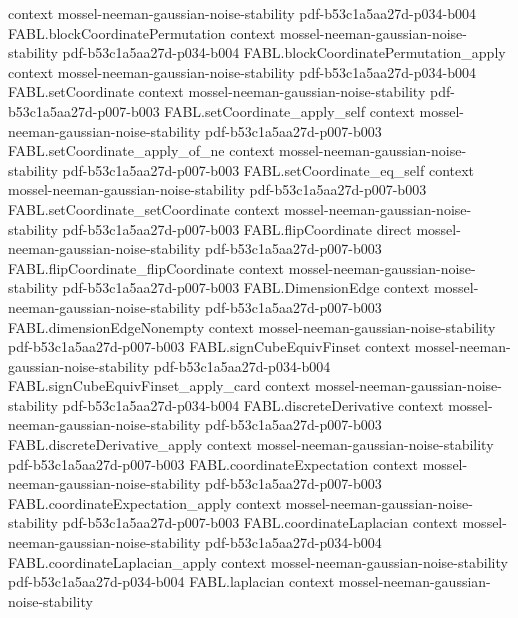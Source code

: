 \begin{theorem}
  {context}
  {mossel-neeman-gaussian-noise-stability}
  {pdf-b53c1a5aa27d-p034-b004}
\proofstep
  {FABL.blockCoordinatePermutation}
  {context}
  {mossel-neeman-gaussian-noise-stability}
  {pdf-b53c1a5aa27d-p034-b004}
\proofstep
  {FABL.blockCoordinatePermutation_apply}
  {context}
  {mossel-neeman-gaussian-noise-stability}
  {pdf-b53c1a5aa27d-p034-b004}
\proofstep
  {FABL.setCoordinate}
  {context}
  {mossel-neeman-gaussian-noise-stability}
  {pdf-b53c1a5aa27d-p007-b003}
\proofstep
  {FABL.setCoordinate_apply_self}
  {context}
  {mossel-neeman-gaussian-noise-stability}
  {pdf-b53c1a5aa27d-p007-b003}
\proofstep
  {FABL.setCoordinate_apply_of_ne}
  {context}
  {mossel-neeman-gaussian-noise-stability}
  {pdf-b53c1a5aa27d-p007-b003}
\proofstep
  {FABL.setCoordinate_eq_self}
  {context}
  {mossel-neeman-gaussian-noise-stability}
  {pdf-b53c1a5aa27d-p007-b003}
\proofstep
  {FABL.setCoordinate_setCoordinate}
  {context}
  {mossel-neeman-gaussian-noise-stability}
  {pdf-b53c1a5aa27d-p007-b003}
\proofstep
  {FABL.flipCoordinate}
  {direct}
  {mossel-neeman-gaussian-noise-stability}
  {pdf-b53c1a5aa27d-p007-b003}
\proofstep
  {FABL.flipCoordinate_flipCoordinate}
  {context}
  {mossel-neeman-gaussian-noise-stability}
  {pdf-b53c1a5aa27d-p007-b003}
\proofstep
  {FABL.DimensionEdge}
  {context}
  {mossel-neeman-gaussian-noise-stability}
  {pdf-b53c1a5aa27d-p007-b003}
\proofstep
  {FABL.dimensionEdgeNonempty}
  {context}
  {mossel-neeman-gaussian-noise-stability}
  {pdf-b53c1a5aa27d-p007-b003}
\proofstep
  {FABL.signCubeEquivFinset}
  {context}
  {mossel-neeman-gaussian-noise-stability}
  {pdf-b53c1a5aa27d-p034-b004}
\proofstep
  {FABL.signCubeEquivFinset_apply_card}
  {context}
  {mossel-neeman-gaussian-noise-stability}
  {pdf-b53c1a5aa27d-p034-b004}
\proofstep
  {FABL.discreteDerivative}
  {context}
  {mossel-neeman-gaussian-noise-stability}
  {pdf-b53c1a5aa27d-p007-b003}
\proofstep
  {FABL.discreteDerivative_apply}
  {context}
  {mossel-neeman-gaussian-noise-stability}
  {pdf-b53c1a5aa27d-p007-b003}
\proofstep
  {FABL.coordinateExpectation}
  {context}
  {mossel-neeman-gaussian-noise-stability}
  {pdf-b53c1a5aa27d-p007-b003}
\proofstep
  {FABL.coordinateExpectation_apply}
  {context}
  {mossel-neeman-gaussian-noise-stability}
  {pdf-b53c1a5aa27d-p007-b003}
\proofstep
  {FABL.coordinateLaplacian}
  {context}
  {mossel-neeman-gaussian-noise-stability}
  {pdf-b53c1a5aa27d-p034-b004}
\proofstep
  {FABL.coordinateLaplacian_apply}
  {context}
  {mossel-neeman-gaussian-noise-stability}
  {pdf-b53c1a5aa27d-p034-b004}
\proofstep
  {FABL.laplacian}
  {context}
  {mossel-neeman-gaussian-noise-stability}

\end{theorem}

